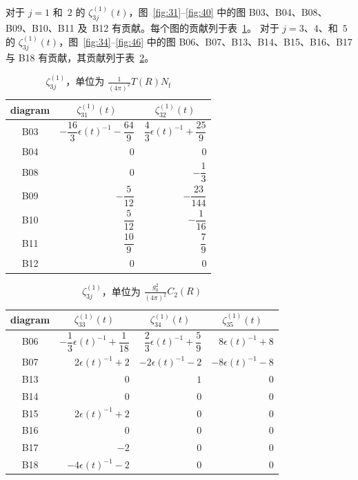 对于 $j=1$ 和~$2$ 的 $\zeta_{3j}^{(1)}(t)$，图~\ref{fig:31}--\ref{fig:40}
中的图 B03、B04、B08、B09、B10、B11 及~B12 有贡献。每个图的贡献列于表~\ref{table:2}。
对于 $j=3$、$4$、和~$5$ 的 $\zeta_{3j}^{(1)}(t)$，图~\ref{fig:34}--\ref{fig:46}
中的图 B06、B07、B13、B14、B15、B16、B17 与 B18 有贡献，其贡献列于表~\ref{table:3}。
%
\begin{table}
\caption{$\zeta_{3j}^{(1)}$，单位为 $\frac{1}{(4\pi)^2}T(R)N_{\mathrm{f}}$}
\label{table:2}
\begin{center}
\renewcommand{\arraystretch}{2.2}
\setlength{\tabcolsep}{20pt}
\begin{tabular}{crr}
\toprule
 diagram & \multicolumn{1}{c}{$\zeta_{31}^{(1)}(t)$}
 & \multicolumn{1}{c}{$\zeta_{32}^{(1)}(t)$} \\
\midrule
 B03  & $-\dfrac{16}{3}\epsilon(t)^{-1}-\dfrac{64}{9}$ & $\dfrac{4}{3}\epsilon(t)^{-1}+\dfrac{25}{9}$ \\
 B04  & $0$ & $0$ \\
 B08  & $0$ & $-\dfrac{1}{3}$ \\
 B09  & $-\dfrac{5}{12}$ & $-\dfrac{23}{144}$ \\
 B10  & $\dfrac{5}{12}$ & $-\dfrac{1}{16}$ \\
 B11  & $\dfrac{10}{9}$ & $\dfrac{7}{9}$ \\
 B12  & $0$ & $0$ \\
\bottomrule
\end{tabular}
\end{center}
\end{table}
%
\begin{table}
\caption{$\zeta_{3j}^{(1)}$，单位为 $\frac{g_0^2}{(4\pi)^2}C_2(R)$}
\label{table:3}
\begin{center}
\renewcommand{\arraystretch}{2.2}
\setlength{\tabcolsep}{20pt}
\begin{tabular}{crrr}
\toprule
 diagram & \multicolumn{1}{c}{$\zeta_{33}^{(1)}(t)$}
 & \multicolumn{1}{c}{$\zeta_{34}^{(1)}(t)$}
 & \multicolumn{1}{c}{$\zeta_{35}^{(1)}(t)$} \\
\midrule
 B06 & $-\dfrac{1}{3}\epsilon(t)^{-1}+\dfrac{1}{18}$ & $\dfrac{2}{3}\epsilon(t)^{-1}+\dfrac{5}{9}$ & $8\epsilon(t)^{-1}+8$ \\
 B07 & $2\epsilon(t)^{-1}+2$ & $-2\epsilon(t)^{-1}-2$ & $-8\epsilon(t)^{-1}-8$ \\
 B13 & $0$ & $1$ & $0$ \\
 B14 & $0$ & $0$ & $0$ \\
 B15 & $2\epsilon(t)^{-1}+2$ & $0$ & $0$ \\
 B16 & $0$ & $0$ & $0$ \\
 B17 & $-2$ & $0$ & $0$ \\
 B18 & $-4\epsilon(t)^{-1}-2$ & $0$ & $0$ \\
\bottomrule
\end{tabular}
\end{center}
\end{table}
